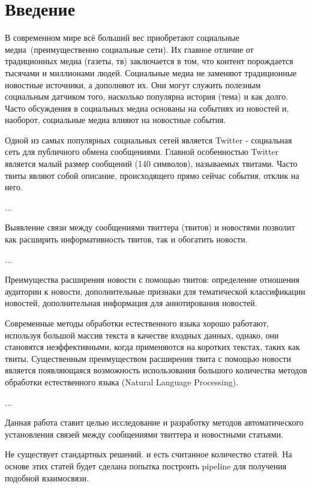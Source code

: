 \section*{Введение}
    В современном мире всё больший вес приобретают социальные медиа~(преимущественно социальные сети). Их главное отличие от традиционных медиа (газеты, тв) заключается в том, что контент порождается тысячами и миллионами людей. Социальные медиа не заменяют традиционные новостные источники, а дополняют их. Они могут служить полезным социальным датчиком того, насколько популярна история (тема) и как долго. Часто обсуждения в социальных медиа основаны на событиях из новостей и, наоборот, социальные медиа влияют на новостные события.

    Одной из самых популярных социальных сетей является Twitter - социальная сеть для публичного обмена сообщениями. Главной особенностью Twitter является малый размер сообщений (140 символов), называемых твитами. Часто твиты являют собой описание, происходящего прямо сейчас события, отклик на него.

    ...

    Выявление связи между сообщениями твиттера (твитов) и новостями позволит как расширить информативность твитов, так и обогатить новости.

    ...

    Преимущества расширения новости с помощью твитов: определение отношения аудитории к новости, дополнительные признаки для тематической классификации новостей, дополнительная информация для аннотирования новостей.

    Современные методы обработки естественного языка хорошо работают, используя большой массив текста в качестве входных данных, однако, они становятся неэффективными, когда применяются на коротких текстах, таких как твиты. Существенным преимуществом расширения твита с помощью новости является появляющаяся возможность использования большого количества методов обработки естественного языка (Natural Language Processing).

    ...


    Данная работа ставит целью исследование и разработку методов автоматического установления связей между сообщениями твиттера и новостными статьями.

    {\color{red} Не существует стандартных решений. и есть считанное количество статей. На основе этих статей будет сделана попытка построить pipeline для получения подобной взаимосвязи.}

    \clearpage